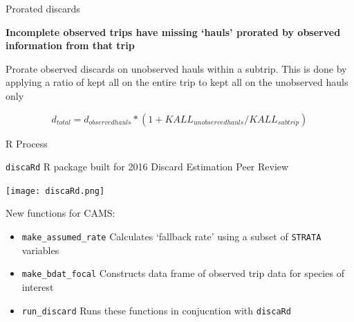 \documentclass[
  ignorenonframetext,
]{beamer}
\providecommand{\tightlist}{%
  \setlength{\itemsep}{0pt}\setlength{\parskip}{0pt}}
\begin{document}
\begin{frame}{Prorated discards}
\protect\hypertarget{prorated-discards}{}

\textbf{Incomplete observed trips have missing `hauls' prorated by
observed information from that trip}

Prorate observed discards on unobserved hauls within a subtrip. This is
done by applying a ratio of kept all on the entire trip to kept all on
the unobserved hauls only

\[d_{total} = d_{observedhauls}*(1+KALL_{unobserved hauls}/KALL_{subtrip})\]

\end{frame}

\begin{frame}[fragile]{R Process}
\protect\hypertarget{r-process}{}

\texttt{discaRd} R package built for 2016 Discard Estimation Peer Review

\texttt{[image: discaRd.png]}

New functions for CAMS:

\begin{itemize}
\tightlist
\item
  \texttt{make\_assumed\_rate} Calculates `fallback rate' using a subset
  of \texttt{STRATA} variables
\item
  \texttt{make\_bdat\_focal} Constructs data frame of observed trip data
  for species of interest
\item
  \texttt{run\_discard} Runs these functions in conjucntion with
  \texttt{discaRd}
\end{itemize}

\end{frame}
\end{document}

